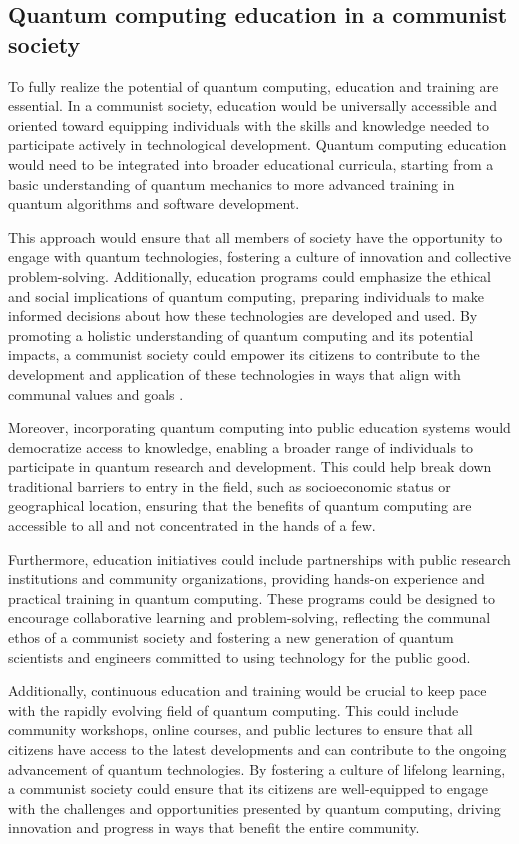 \subsection{Quantum computing education in a communist society}

To fully realize the potential of quantum computing, education and training are essential. In a communist society, education would be universally accessible and oriented toward equipping individuals with the skills and knowledge needed to participate actively in technological development. Quantum computing education would need to be integrated into broader educational curricula, starting from a basic understanding of quantum mechanics to more advanced training in quantum algorithms and software development.

This approach would ensure that all members of society have the opportunity to engage with quantum technologies, fostering a culture of innovation and collective problem-solving. Additionally, education programs could emphasize the ethical and social implications of quantum computing, preparing individuals to make informed decisions about how these technologies are developed and used. By promoting a holistic understanding of quantum computing and its potential impacts, a communist society could empower its citizens to contribute to the development and application of these technologies in ways that align with communal values and goals \cite[pp.~175-180]{QuantumEducation2020}.

Moreover, incorporating quantum computing into public education systems would democratize access to knowledge, enabling a broader range of individuals to participate in quantum research and development. This could help break down traditional barriers to entry in the field, such as socioeconomic status or geographical location, ensuring that the benefits of quantum computing are accessible to all and not concentrated in the hands of a few.

Furthermore, education initiatives could include partnerships with public research institutions and community organizations, providing hands-on experience and practical training in quantum computing. These programs could be designed to encourage collaborative learning and problem-solving, reflecting the communal ethos of a communist society and fostering a new generation of quantum scientists and engineers committed to using technology for the public good.

Additionally, continuous education and training would be crucial to keep pace with the rapidly evolving field of quantum computing. This could include community workshops, online courses, and public lectures to ensure that all citizens have access to the latest developments and can contribute to the ongoing advancement of quantum technologies. By fostering a culture of lifelong learning, a communist society could ensure that its citizens are well-equipped to engage with the challenges and opportunities presented by quantum computing, driving innovation and progress in ways that benefit the entire community.

